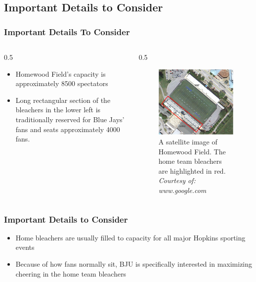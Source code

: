 \documentclass[compress,handout,10pt]{beamer}
\let\olditem\item
\renewcommand{\item}{\setlength{\itemsep}{0.5\baselineskip}\olditem}
\begin{document}
\subsection{Important Details to Consider}

\begin{frame}
	\frametitle {Important Details To Consider}
	\begin {columns}
		\begin {column}{0.5\textwidth}
		\begin{itemize}
			\item Homewood Field's capacity is approximately 8500 spectators \cite{wiki}
			\item Long rectangular section of the bleachers in the lower left is traditionally reserved for Blue Jays' fans and seats approximately 4000 fans.
		\end {itemize}
	\end {column}
	\begin {column}{0.5\textwidth}
	\begin {figure}
	\begin{center}
		\includegraphics [width=2in] {Bleachers.png}
		\caption {{\tiny A satellite image of Homewood Field. The home team bleachers are highlighted in red. \textit{Courtesy of: www.google.com}}}
		\end{center}
	\end{figure}
\end {column}
\end {columns}
\end{frame}


\begin{frame}
	\frametitle{Important Details to Consider}
	\begin{itemize}
		\item Home bleachers are usually filled to capacity for all major Hopkins sporting events
		\item Because of how fans normally sit, BJU is specifically interested in maximizing cheering in the home team bleachers
	\end{itemize}
\end{frame}
\end{document}
